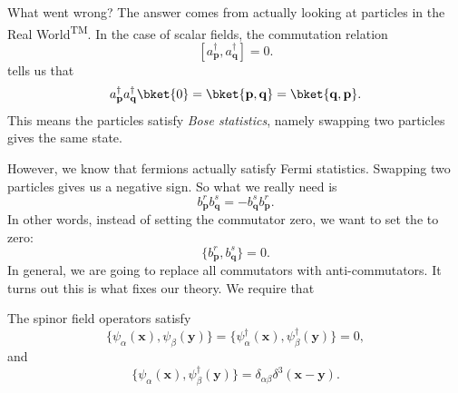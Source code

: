 \documentclass[a4paper]{article}
\begin{document}
%
%

What went wrong? The answer comes from actually looking at particles in the Real World\textsuperscript{TM}. In the case of scalar fields, the commutation relation
\[
  [a_\mathbf{p}^\dagger, a_\mathbf{q}^\dagger] = 0.
\]
tells us that
\[
  a_\mathbf{p}^\dagger a_\mathbf{q}^\dagger \bket{0} = \bket{\mathbf{p}, \mathbf{q}} = \bket{\mathbf{q}, \mathbf{p}}.
\]
This means the particles satisfy \emph{Bose statistics}, namely swapping two particles gives the same state.

However, we know that fermions actually satisfy Fermi statistics. Swapping two particles gives us a negative sign. So what we really need is
\[
  b_\mathbf{p}^rb_\mathbf{q}^s = - b_\mathbf{q}^s b_\mathbf{p}^r.
\]
In other words, instead of setting the commutator zero, we want to set the  to zero:
\[
  \{b_\mathbf{p}^r, b_\mathbf{q}^s\} = 0.
\]
In general, we are going to replace all commutators with anti-commutators. It turns out this is what fixes our theory. We require that
\begin{axiom}
  The spinor field operators satisfy
  \[
    \{\psi_\alpha (\mathbf{x}), \psi_\beta(\mathbf{y})\} = \{\psi_\alpha^\dagger(\mathbf{x}), \psi_\beta^\dagger(\mathbf{y})\} = 0,
  \]
  and
  \[
    \{\psi_\alpha(\mathbf{x}), \psi_\beta^\dagger(\mathbf{y})\} = \delta_{\alpha\beta} \delta^3(\mathbf{x} - \mathbf{y}).
  \]
\end{axiom}
\end{document}

